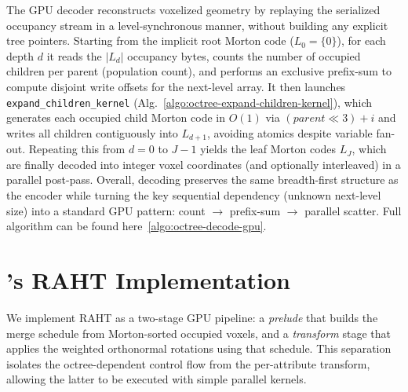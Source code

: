 \begin{algorithm}[h!]
  \caption{\texttt{expand\_children\_kernel}: Expand occupied children and generate Morton codes}
  \label{algo:octree-expand-children-kernel}
\SetAlgoLined
\DontPrintSemicolon
{}


\end{algorithm}
The GPU decoder reconstructs voxelized geometry by replaying the serialized occupancy stream in a level-synchronous manner, without building any explicit tree pointers.
%
Starting from the implicit root Morton code ($L_0=\{0\}$), for each depth $d$ it reads the $|L_d|$ occupancy bytes, counts the number of occupied children per parent (population count), and performs an exclusive prefix-sum to compute disjoint write offsets for the next-level array.
%
It then launches \texttt{expand\_children\_kernel} (Alg.~\ref{algo:octree-expand-children-kernel}), which generates each occupied child Morton code in $O(1)$ via $(parent \ll 3)+i$ and writes all children contiguously into $L_{d+1}$, avoiding atomics despite variable fan-out.
%
Repeating this from $d=0$ to $J{-}1$ yields the leaf Morton codes $L_J$, which are finally decoded into integer voxel coordinates (and optionally interleaved) in a parallel post-pass.
%
Overall, decoding preserves the same breadth-first structure as the encoder while turning the key sequential dependency (unknown next-level size) into a standard GPU pattern: count $\rightarrow$ prefix-sum $\rightarrow$ parallel scatter.
%
Full algorithm can be found here~\ref{algo:octree-decode-gpu}.

\section{\gsnfs{}'s RAHT Implementation}\label{app:sysn-raht-encod}

We implement RAHT as a two-stage GPU pipeline: a \emph{prelude} that builds the merge schedule from Morton-sorted occupied voxels, and a \emph{transform} stage that applies the weighted orthonormal rotations using that schedule. This separation isolates the octree-dependent control flow from the per-attribute transform, allowing the latter to be executed with simple parallel kernels.

